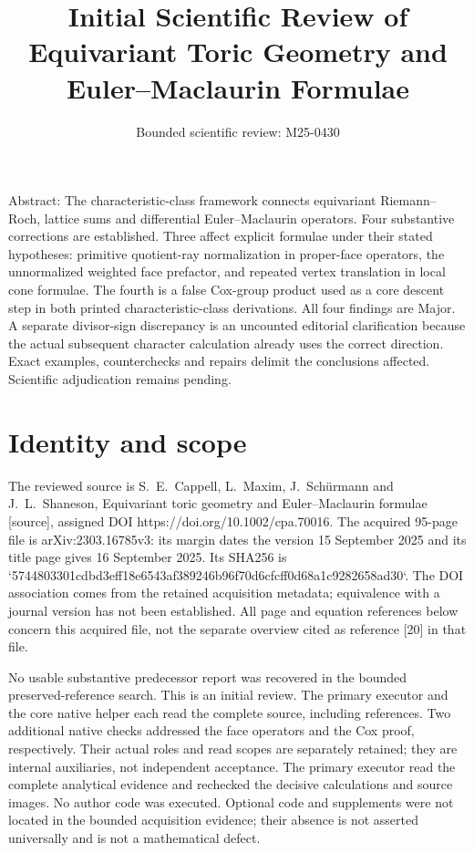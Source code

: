 \documentclass[10pt]{article}
\title{Initial Scientific Review of
Equivariant Toric Geometry and Euler–Maclaurin Formulae}
\author{Bounded scientific review: M25-0430}
\date{}
\begin{document}
\maketitle
Abstract: The characteristic-class framework connects equivariant Riemann–Roch, lattice sums and differential Euler–Maclaurin operators. Four substantive corrections are established. Three affect explicit formulae under their stated hypotheses: primitive quotient-ray normalization in proper-face operators, the unnormalized weighted face prefactor, and repeated vertex translation in local cone formulae. The fourth is a false Cox-group product used as a core descent step in both printed characteristic-class derivations. All four findings are Major. A separate divisor-sign discrepancy is an uncounted editorial clarification because the actual subsequent character calculation already uses the correct direction. Exact examples, counterchecks and repairs delimit the conclusions affected. Scientific adjudication remains pending.\par
\section*{Identity and scope}
The reviewed source is S. E. Cappell, L. Maxim, J. Schürmann and J. L. Shaneson, Equivariant toric geometry and Euler–Maclaurin formulae [source], assigned DOI https://doi.org/10.1002/cpa.70016. The acquired 95-page file is arXiv:2303.16785v3: its margin dates the version 15 September 2025 and its title page gives 16 September 2025. Its SHA256 is `5744803301cdbd3eff18e6543af389246b96f70d6cfcff0d68a1c9282658ad30`. The DOI association comes from the retained acquisition metadata; equivalence with a journal version has not been established. All page and equation references below concern this acquired file, not the separate overview cited as reference [20] in that file.\par
No usable substantive predecessor report was recovered in the bounded preserved-reference search. This is an initial review. The primary executor and the core native helper each read the complete source, including references. Two additional native checks addressed the face operators and the Cox proof, respectively. Their actual roles and read scopes are separately retained; they are internal auxiliaries, not independent acceptance. The primary executor read the complete analytical evidence and rechecked the decisive calculations and source images. No author code was executed. Optional code and supplements were not located in the bounded acquisition evidence; their absence is not asserted universally and is not a mathematical defect.\par
\end{document}
